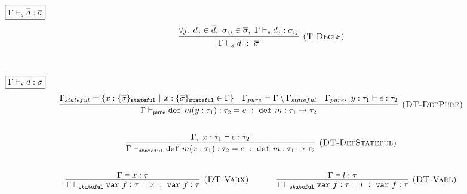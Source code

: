 \documentclass{article}
\newcommand{\keywadj}[1]{\mathtt{#1}}
\newcommand{\keyw}[1]{\keywadj{#1}~}
\begin{document}
$\fbox{$\Gamma \vdash_s \overline{d} : \overline{\sigma}$}$
\[
\begin{array}{c}
\infer[\textsc{(T-Decls)}]
  {\Gamma \vdash_{s} \overline{d}~:~\overline{\sigma}}
  {\forall j,~d_j \in \overline{d},~\sigma_{ij} \in \overline{\sigma},~\Gamma \vdash_{s} d_j : \sigma_{ij}}\\[5ex]

\end{array}
\]

$\fbox{$\Gamma \vdash_s d : \sigma$}$
\[
\begin{array}{c}


  
\infer[\textsc{(DT-DefPure)}]
  {\Gamma \vdash_{\keywadj{pure}} \keyw{def} m(y : \tau_1) : \tau_2 = e~:~\keyw{def} m : \tau_1 \rightarrow \tau_2}
  {\Gamma_{stateful} = \{x : \{ \overline{\sigma} \}_{\keywadj{stateful}} ~|~ x : \{ \overline{\sigma} \}_{\keywadj{stateful}} \in \Gamma\} & \Gamma_{pure} = \Gamma \setminus \Gamma_{stateful} & \Gamma_{pure},~y : \tau_1 \vdash e : \tau_2}\\[5ex]

\infer[\textsc{(DT-DefStateful)}]
  {\Gamma \vdash_{\keywadj{stateful}} \keyw{def} m(x : \tau_1) : \tau_2 = e~:~\keyw{def} m : \tau_1 \rightarrow \tau_2}
  {\Gamma,~x : \tau_1 \vdash e : \tau_2}\\[5ex]

\infer[\textsc{(DT-Varx)}]
  {\Gamma \vdash_{\keywadj{stateful}} \keyw{var} f : \tau = x~:~\keyw{var} f : \tau}
  {\Gamma \vdash x : \tau}%
~~~~~~~~~~
\infer[\textsc{(DT-Varl)}]
  {\Gamma \vdash_{\keywadj{stateful}} \keyw{var} f : \tau = l~:~\keyw{var} f : \tau}
  {\Gamma \vdash l : \tau}\\[5ex]

\end{array}
\]
\end{document}
